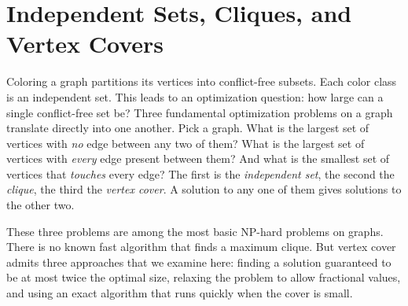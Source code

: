 \chapter{Independent Sets, Cliques, and Vertex Covers}

Coloring a graph partitions its vertices into conflict-free subsets. Each color class is an independent set. This leads to an optimization question: how large can a single conflict-free set be?
Three fundamental optimization problems on a graph translate directly into one another. Pick a graph. What is the largest set of
vertices with \emph{no} edge between any two of them? What is the largest set of
vertices with \emph{every} edge present between them? And what is the smallest set
of vertices that \emph{touches} every edge? The first is the \emph{independent set},
the second the \emph{clique}, the third the \emph{vertex cover}. A solution to any one of them gives solutions to the other two.

These three problems are among the most basic NP-hard problems on graphs.
There is no known fast algorithm that finds a maximum clique. But vertex cover admits three approaches that we examine here: finding a solution guaranteed to be at most twice the optimal size, relaxing the problem to allow fractional values, and using an exact algorithm that runs quickly when the cover is small.

